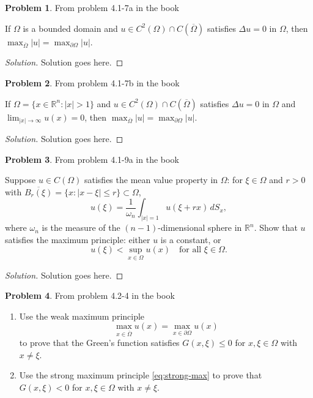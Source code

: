 \documentclass[11pt]{article}
\newcommand{\R}{\mathbb{R}}
\newcommand{\lap}{\Delta}
\theoremstyle{definition}
\newtheorem{problem}{Problem}
\begin{document}
\begin{problem}
From problem 4.1-7a in the book

If $\Omega$ is a bounded domain and $u \in C^2(\Omega) \cap C(\overline{\Omega})$
satisfies $\lap u = 0$ in $\Omega$, then
$\max_{\overline{\Omega}} |u| = \max_{\partial\Omega} |u|$.
\end{problem}

\begin{proof}[Solution]
Solution goes here.
\end{proof}

\begin{problem}
From problem 4.1-7b in the book

If $\Omega = \{x \in \R^n : |x| > 1\}$ and
$u \in C^2(\Omega) \cap C(\overline{\Omega})$ satisfies $\lap u = 0$ in $\Omega$
and $\lim_{|x| \to \infty} u(x) = 0$, then
$\max_{\overline{\Omega}} |u| = \max_{\partial\Omega} |u|$.
\end{problem}

\begin{proof}[Solution]
Solution goes here.
\end{proof}

\begin{problem}
From problem 4.1-9a in the book

Suppose $u \in C(\Omega)$ satisfies the mean value property in $\Omega$: for
$\xi \in \Omega$ and $r > 0$ with
$\overline{B_r(\xi)} = \{x : |x - \xi| \le r\} \subset \Omega$,
\begin{equation} \label{eq:mvp}
u(\xi) = \frac{1}{\omega_n} \int_{|x|=1} u(\xi + r x) \, dS_x,
\end{equation}
where $\omega_n$ is the measure of the $(n-1)$-dimensional sphere in $\R^n$.
Show that $u$ satisfies the maximum principle: either $u$ is a constant, or
\begin{equation} \label{eq:strong-max}
u(\xi) < \sup_{x \in \Omega} u(x) \quad \text{for all } \xi \in \Omega.
\end{equation}
\end{problem}

\begin{proof}[Solution]
Solution goes here.
\end{proof}

\begin{problem}
From problem 4.2-4 in the book

\begin{enumerate}[label=(\alph*)]
\item Use the weak maximum principle
\begin{equation} \label{eq:weak-max}
\max_{x \in \overline{\Omega}} u(x) = \max_{x \in \partial\Omega} u(x)
\end{equation}
to prove that the Green's function satisfies $G(x,\xi) \le 0$ for
$x, \xi \in \Omega$ with $x \ne \xi$.
\item Use the strong maximum principle \eqref{eq:strong-max} to prove that
$G(x,\xi) < 0$ for $x, \xi \in \Omega$ with $x \ne \xi$.
\end{enumerate}
\end{problem}
\end{document}
